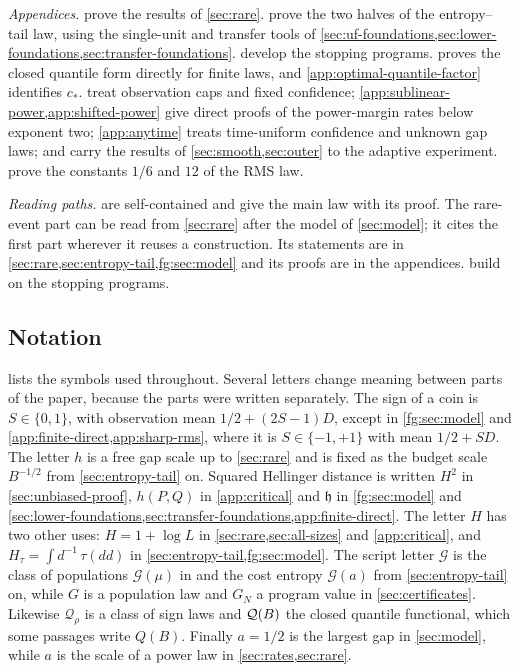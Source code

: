 \emph{Appendices.} 
prove the results of \cref{sec:rare}.
 prove the two halves of
the entropy--tail law, using the single-unit and transfer tools of
\cref{sec:uf-foundations,sec:lower-foundations,sec:transfer-foundations}.
 develop the stopping
programs.  proves the closed quantile form
directly for finite laws, and \cref{app:optimal-quantile-factor}
identifies $c_*$. 
treat observation caps and fixed confidence;
\cref{app:sublinear-power,app:shifted-power} give direct proofs of the
power-margin rates below exponent two; \cref{app:anytime} treats
time-uniform confidence and unknown gap laws; and
 carry the results of
\cref{sec:smooth,sec:outer} to the adaptive experiment.
 prove the constants $1/6$ and $12$ of
the RMS law.

\emph{Reading paths.}  are
self-contained and give the main law with its proof. The rare-event part
can be read from \cref{sec:rare} after the model of \cref{sec:model}; it
cites the first part wherever it reuses a construction. Its statements
are in \cref{sec:rare,sec:entropy-tail,fg:sec:model} and its proofs are in
the appendices.  build on the
stopping programs.

\subsection{Notation}\label{sec:notation-table}
 lists the symbols used throughout. Several letters
change meaning between parts of the paper, because the parts were written
separately. The sign of a coin is $S\in\{0,1\}$, with observation mean
$1/2+(2S-1)D$, except in \cref{fg:sec:model} and
\cref{app:finite-direct,app:sharp-rms},
where it is $S\in\{-1,+1\}$ with mean $1/2+SD$. The letter $h$ is a free
gap scale up to \cref{sec:rare} and is fixed as the budget scale
$B^{-1/2}$ from \cref{sec:entropy-tail} on. Squared Hellinger distance is
written $H^2$ in \cref{sec:unbiased-proof}, $h(P,Q)$ in \cref{app:critical}
and $\mathfrak h$ in \cref{fg:sec:model} and
\cref{sec:lower-foundations,sec:transfer-foundations,app:finite-direct}.
The letter $H$ has two other uses: $H=1+\log L$ in
\cref{sec:rare,sec:all-sizes} and \cref{app:critical}, and
$H_\tau=\int d^{-1}\,\tau(dd)$ in \cref{sec:entropy-tail,fg:sec:model}.
The script letter $\mathcal G$ is the class of populations
$\mathcal G(\mu)$ in  and the cost entropy
$\mathcal G(a)$ from \cref{sec:entropy-tail} on, while $G$ is a population
law and $G_N$ a program value in \cref{sec:certificates}. Likewise
$\mathcal Q_\rho$ is a class of sign laws and $\mathcal Q(B)$ the closed quantile
functional, which some passages write $Q(B)$. Finally $a=1/2$ is the largest gap
in \cref{sec:model}, while $a$ is the scale of a power law in
\cref{sec:rates,sec:rare}.

